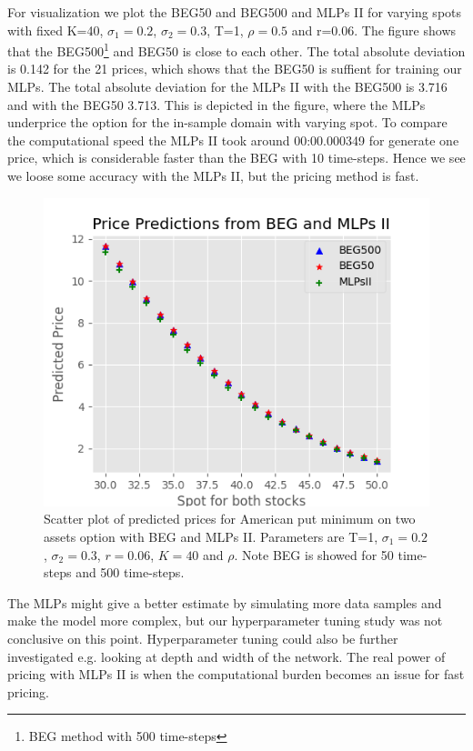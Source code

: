 For visualization we plot the BEG50 and BEG500 and MLPs II for varying spots with fixed K=40, $\sigma_1=0.2$, $\sigma_2=0.3$, T=1, $\rho=0.5$  and r=0.06. The figure shows that the BEG500\footnote{BEG method with 500 time-steps} and BEG50 is close to each other. The total absolute deviation is 0.142 for the 21 prices, which shows that the BEG50 is suffient for training our MLPs. The total absolute deviation for the MLPs II with the BEG500 is 3.716 and with the BEG50 3.713. This is depicted in the figure, where the MLPs underprice the option for the in-sample domain with varying spot. To compare the computational speed the MLPs II took around 00:00.000349 for generate one price, which is considerable faster than the BEG with 10 time-steps. Hence we see we loose some accuracy with the MLPs II, but the pricing method is fast. 

\begin{figure}[H]
\centering
\includegraphics{Figures/compareBEGMLPsII.png}
\decoRule
\caption[Compare BEG and MLPs II]{Scatter plot of predicted prices for American put minimum on two assets option with BEG and MLPs II. Parameters are T=1, $\sigma_1=0.2$, $\sigma_2=0.3$, $r=0.06$, $K=40$ and $\rho$. Note BEG is showed for 50 time-steps and 500 time-steps.}
\label{fig:histLSMMLPsI}
\end{figure}

The MLPs might give a better estimate by simulating more data samples and make the model more complex, but our hyperparameter tuning study was not conclusive on this point. Hyperparameter tuning could also be further investigated e.g. looking at depth and width of the network. The real power of pricing with MLPs II is when the computational burden becomes an issue for fast pricing. 

